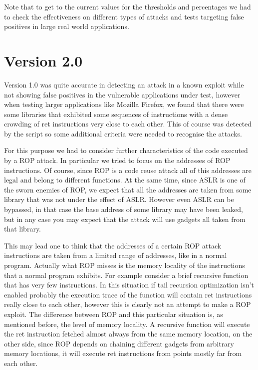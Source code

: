 \documentclass[Lau,binding=0.6cm]{sapthesis}
\begin{document}
Note that to get to the current values for the thresholds and percentages we had to check the effectiveness on different types of attacks and tests targeting false positives in large real world applications.

\section{Version 2.0}

Version 1.0 was quite accurate in detecting an attack in a known exploit while not showing false positives in the vulnerable applications under test, however when testing larger applications like Mozilla Firefox, we found that there were some libraries that exhibited some sequences of instructions with a dense crowding of ret instructions very close to each other. This of course was detected by the script so some additional criteria were needed to recognise the attacks. 

For this purpose we had to consider further characteristics of the code executed by a ROP attack. In particular we tried to focus on the addresses of ROP instructions. Of course, since ROP is a code reuse attack all of this addresses are legal and belong to different functions. At the same time, since ASLR is one of the sworn enemies of ROP, we expect that all the addresses are taken from some library that was not under the effect of ASLR. However even ASLR can be bypassed, in that case the base address of some library may have been leaked, but in any case you may expect that the attack will use gadgets all taken from that library.

This may lead one to think that the addresses of a certain ROP attack instructions are taken from a limited range of addresses, like in a normal program. Actually what ROP misses is the memory locality of the instructions that a normal program exhibits. For example consider a brief recursive function that has very few instructions. In this situation if tail recursion optimization isn’t enabled probably the execution trace of the function will contain ret instructions really close to each other, however this is clearly not an attempt to make a ROP exploit. The difference between ROP and this particular situation is, as mentioned before, the level of memory locality. A recursive function will execute the ret instruction fetched almost always from the same memory location, on the other side, since ROP depends on chaining different gadgets from arbitrary memory locations, it will execute ret instructions from points mostly far from each other.
\end{document}
